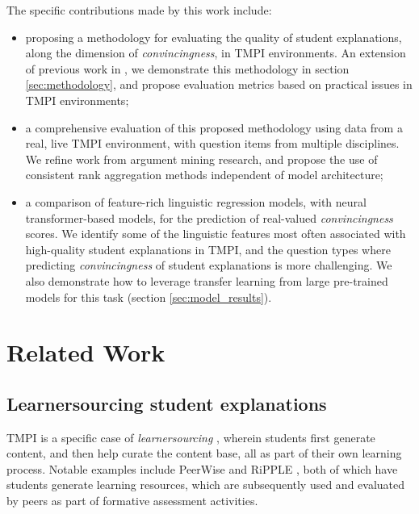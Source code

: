 \documentclass[notitlepage,12pt]{jedm}
\begin{document}
The specific contributions made by this work include:
\begin{itemize}
	\item proposing a methodology for evaluating the quality of student 
	explanations, along the dimension of \textit{convincingness}, in TMPI 
	environments. 
	An extension of previous work in \cite{bhatnagar_learnersourcing_2020}, we 
	demonstrate this methodology in section \ref{sec:methodology}, and 
	propose evaluation metrics based on practical issues in TMPI environments;
	
	\item a comprehensive evaluation of this proposed methodology using data 
	from a real, live TMPI environment, with question items from multiple 
	disciplines. 
	We refine work from argument mining research, and propose the use of 
	consistent rank aggregation methods independent of model architecture;
	
	\item a comparison of feature-rich linguistic regression models, with 
	neural transformer-based models, for the prediction of real-valued
	\textit{convincingness} scores. 
	We identify some of the linguistic features most often associated with 
	high-quality student explanations in TMPI, and the question types where 
	predicting \textit{convincingness} of student explanations is more 
	challenging.
	We also demonstrate how to leverage transfer learning from large 
	pre-trained models for this task (section \ref{sec:model_results}).
\end{itemize}


\section{Related Work}\label{sec:related_work}

\subsection{Learnersourcing student explanations}
TMPI is a specific case of  \textit{learnersourcing} 
\cite{weir_learnersourcing_2015}, wherein students first generate content, and 
then help curate the content base, all as part of their own learning process.
Notable examples include PeerWise \cite{denny_peerwise:_2008} and RiPPLE 
\cite{khosravi_ripple_2019}, both of which have students generate learning 
resources, which are subsequently used and evaluated by peers as part of 
formative assessment activities.
\end{document}

